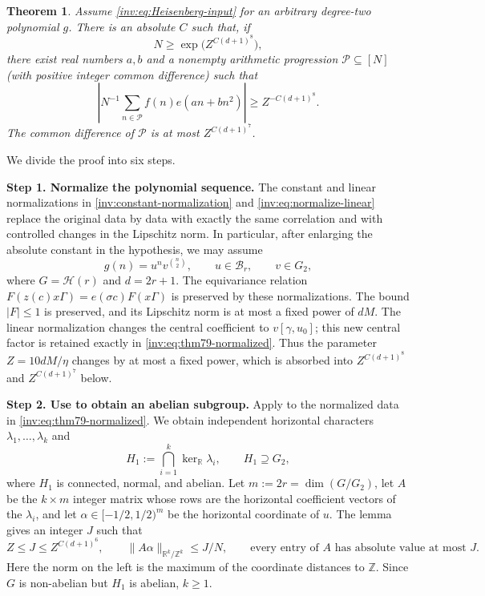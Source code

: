 \documentclass[twoside]{aomart}
\makeatletter
\theoremstyle{paperplain}
\newtheorem{theorem}{Theorem}[section]
\theoremstyle{paperdefinition}
\renewenvironment{proof}[1][\proofname]{\par\pushQED{\qed}%
  \normalfont\topsep6\p@\@plus3\p@\relax\trivlist
  \item[\hskip\labelsep\itshape #1\@addpunct{.}]\ignorespaces
}{\popQED\endtrivlist\@endpefalse}
\numberwithin{equation}{section}
\makeatother
\begin{document}
\begin{theorem}
\label{inv:scalar-reduction}
Assume \eqref{inv:eq:Heisenberg-input} for an arbitrary
degree-two polynomial $g$. There is an absolute $C$ such that, if
\begin{equation*}
 N\ge\exp\bigl(Z^{C(d+1)^8}\bigr),
\end{equation*}
there exist real numbers $a,b$ and a nonempty arithmetic progression
$\mathcal P\subseteq[N]$ (with positive integer common difference) such that
\begin{equation*}
 \left|N^{-1}\sum_{n\in\mathcal P}
       f(n)e(an+bn^2)\right|\ge Z^{-C(d+1)^8}.
\end{equation*}
The common difference of $\mathcal P$ is at most $Z^{C(d+1)^7}$.
\end{theorem}

\begin{proof}
We divide the proof into six steps.	
	
\par
\medskip
\noindent\textbf{Step 1. Normalize the polynomial sequence.}
The constant and linear normalizations in
\eqref{inv:constant-normalization} and
\eqref{inv:eq:normalize-linear} replace the original data by data with
exactly the same correlation and with controlled changes in the Lipschitz
norm.  In particular, after enlarging the absolute constant in the
hypothesis, we may assume
\begin{equation}
 g(n)=u^n v^{\binom n2},\qquad
 u\in\mathcal B_r,\qquad v\in G_2,
 \label{inv:eq:thm79-normalized}
\end{equation}
where $G=\mathcal H(r)$ and $d=2r+1$.  The equivariance relation
$F(z(c)x\Gamma)=e(\sigma c)F(x\Gamma)$ is preserved by these
normalizations.  The bound $|F|\le1$ is preserved, and its Lipschitz norm
is at most a fixed power of $dM$.  The linear normalization changes the
central coefficient to $v[\gamma,u_0]$; this new central factor is retained
exactly in \eqref{inv:eq:thm79-normalized}.  Thus the parameter
$Z=10dM/\eta$ changes by at most a fixed power, which is absorbed into
$Z^{C(d+1)^8}$ and $Z^{C(d+1)^7}$ below.

\par
\medskip
\noindent\textbf{Step 2. Use  to obtain an
abelian subgroup.}
Apply  to the normalized data in
\eqref{inv:eq:thm79-normalized}.  We obtain independent horizontal
characters $\lambda_1,\ldots,\lambda_k$ and
\[
 H_1:=\bigcap_{i=1}^{k}\ker_{\mathbb R}\lambda_i,
 \qquad H_1\supseteq G_2,
\]
where $H_1$ is connected, normal, and abelian.  Let
$m:=2r=\dim(G/G_2)$, let $A$ be the $k\times m$ integer matrix whose
rows are the horizontal coefficient vectors of the $\lambda_i$, and let
$\alpha\in[-1/2,1/2)^m$ be the horizontal coordinate of $u$.  The
lemma gives an integer $J$ such that
\begin{equation*}
 Z\le J\le Z^{C(d+1)^6},
 \qquad \|A\alpha\|_{\mathbb R^k/\mathbb Z^k}\le J/N,
 \qquad \text{every entry of }A\text{ has absolute value at most }J.
\end{equation*}
Here the norm on the left is the maximum of the coordinate distances to
$\mathbb Z$.  Since $G$ is non-abelian but $H_1$ is abelian, $k\ge1$.


\end{proof}
\end{document}
